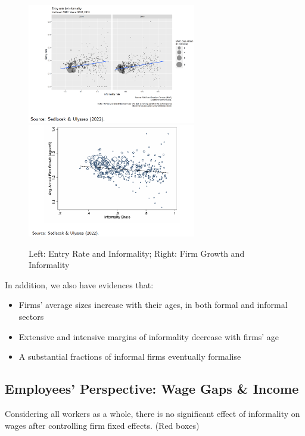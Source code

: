                 \begin{figure}[H]
                    \centering
                    \includegraphics[width=2.9in]{images/ch5/dynamics_2.png}
                    \includegraphics[width=2.9in]{images/ch5/dynamics_3.png}
                    \caption{Left: Entry Rate and Informality; Right: Firm Growth and Informality}
                \end{figure}
                In addition, we also have evidences that:
                \begin{itemize}
                    \item Firms' average sizes increase with their ages, in both formal and informal sectors
                    \item Extensive and intensive margins of informality decrease with firms' age
                    \item A substantial fractions of informal firms eventually formalise
                \end{itemize}
                
            \subsection{Employees' Perspective: Wage Gaps \& Income}
                Considering all workers as a whole, there is no significant effect of informality on wages after controlling firm fixed effects. (Red boxes)
                
